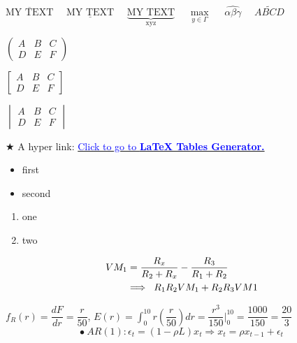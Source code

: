 \documentclass[12pt, letterpaper, oneside]{article}
\begin{document}
\noindent $\overline{\text{MY TEXT}}$ \ \ $\underline{\text{MY TEXT}}$ \ \ $\underbrace{\text{MY TEXT}}_{\text{xyz}}$ \ \ $\underset{y\in\Gamma}{\max}$ \ \ $\widehat{\alpha\beta\gamma}$ \ \ $\widetilde{ABCD}$

\vspace*{0.1cm}

\begin{multicols}{3}
    \raggedcolumns
    $\begin{pmatrix}
    A & B &C \\
    D& E &F
    \end{pmatrix}$
    
    \columnbreak
    $\begin{bmatrix}
    A &B  &C \\
    D&  E& F
    \end{bmatrix}$
    
    \columnbreak
    $\begin{vmatrix}
    A &B  &C \\
    D&  E& F
    \end{vmatrix}$
\end{multicols}

$\bigstar$ A hyper link: \href{http://www.tablesgenerator.com}{\textcolor{blue}{Click to go to \textbf{LaTeX Tables Generator.}}}

\begin{itemize}
    \item first
    \item second
\end{itemize}

\begin{enumerate}
    \item one
    \item two
\end{enumerate}

\begin{align}
    VM_1&=\dfrac{R_x}{R_2+R_x}-\dfrac{R_3}{R_1+R_2} \\ \nonumber
    & \Longrightarrow  \hspace{0.2cm} R_1R_2VM_1 +R_2R_3VM1
\end{align}

$f_{R}(r)=\dfrac{dF}{dr}=\dfrac{r}{50}$, \quad
$\displaystyle E(r)=\int_{0}^{10}r \left( \dfrac{r}{50} \right)dr=\dfrac{r^{3}}{150}\biggr\rvert^{10}_{0}=\dfrac{1000}{150}=\dfrac{20}{3}$\\

\begin{equation}
    \bullet \ AR(1): \epsilon_t =(1-\rho L)x_t \Longrightarrow x_t=\rho x_{t-1}+\epsilon_t
\end{equation}
\end{document}
